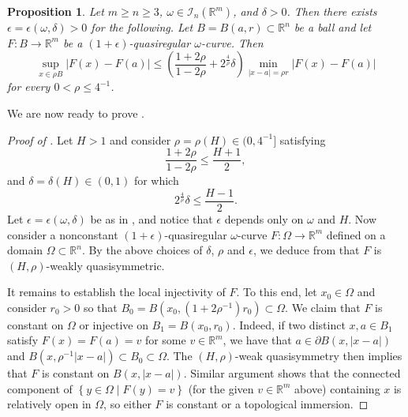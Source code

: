 \documentclass[a4paper,leqno,11pt]{amsart}
\numberwithin{equation}{section}
\newtheorem{proposition}[theorem]{Proposition}
\theoremstyle{remark}
\theoremstyle{remark}
\newcommand{\R}{\mathbb{R}}
\begin{document}
\begin{proposition}\label{prop:7.7:HPP-revisited}
Let $m \geq n \geq 3$, $\omega \in \mathcal{I}_{n}( \R^m )$, and $\delta > 0$. Then there exists $\epsilon = \epsilon( \omega,\delta) > 0$ for the following. Let $B = B( a, r ) \subset \mathbb{R}^n$ be a ball and let $F \colon B \to \mathbb{R}^m$ be a $(1+\epsilon)$-quasiregular $\omega$-curve. Then
\begin{equation*}
    \sup_{ x \in \rho B } | F(x) - F(a) | \leq \left( \frac{ 1+2\rho}{1-2\rho} + 2^{ \frac{4}{\rho} }\delta \right) \min_{ |x-a| = \rho r } | F(x) - F(a) |
\end{equation*}
for every $0 < \rho \leq 4^{-1}$.
\end{proposition}
We are now ready to prove .
\begin{proof}[Proof of ]
Let $H > 1$ and consider $\rho = \rho(H) \in ( 0, 4^{-1} ]$ satisfying
\begin{equation*}
    \frac{ 1+2\rho}{1-2\rho}
    \leq
    \frac{ H + 1 }{ 2 },
\end{equation*}
and $\delta = \delta( H ) \in ( 0, 1 )$ for which
\begin{equation*}
    2^{ \frac{4}{\rho} } \delta \leq \frac{ H - 1 }{ 2 }.
\end{equation*}
Let $\epsilon = \epsilon( \omega, \delta )$ be as in , and notice that $\epsilon$ depends only on $\omega$ and $H$. Now consider a nonconstant $(1+\epsilon)$-quasiregular $\omega$-curve $F \colon \Omega \to \mathbb{R}^m$ defined on a domain $\Omega \subset \R^n$. By the above choices of $\delta$, $\rho$ and $\epsilon$, we deduce from  that $F$ is $( H, \rho )$-weakly quasisymmetric.

It remains to establish the local injectivity of $F$. To this end, let $x_0 \in \Omega$ and consider $r_0 > 0$ so that $B_0 = B( x_0, ( 1 + 2 \rho^{-1} ) r_0 ) \subset \Omega$. We claim that $F$ is constant on $\Omega$ or injective on $B_1 = B( x_0, r_0 )$. Indeed, if two distinct $x, a \in B_1$ satisfy $F(x) = F(a) = v$ for some $v \in \mathbb{R}^m$, we have that $a \in \partial B( x, | x - a | )$ and $B( x, \rho^{-1}|x-a| ) \subset B_0 \subset \Omega$. The $( H, \rho )$-weak quasisymmetry then implies that $F$ is constant on $B( x, |x-a| )$. Similar argument shows that the connected component of $\left\{ y \in \Omega \mid F(y) = v \right\}$ (for the given $v \in \R^m$ above) containing $x$ is relatively open in $\Omega$, so either $F$ is constant or a topological immersion.
\end{proof}
\end{document}
